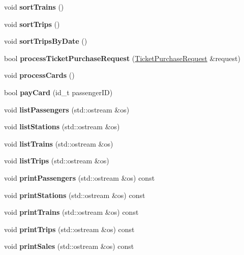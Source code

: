 \begin{DoxyCompactItemize}
void {\bfseries sort\+Trains} ()
\item 
\mbox{\label{classSystem_a9122a0e24a88b5111959fdc87b23bc6b}} 
void {\bfseries sort\+Trips} ()
\item 
\mbox{\label{classSystem_a3a2aace3c50cfbf7f9d2354cd858a59b}} 
void {\bfseries sort\+Trips\+By\+Date} ()
\item 
\mbox{\label{classSystem_ac2b6f3d934b64f4fa56ffb1db1d261df}} 
bool {\bfseries process\+Ticket\+Purchase\+Request} (\mbox{\hyperlink{classTicketPurchaseRequest}{Ticket\+Purchase\+Request}} \&request)
\item 
\mbox{\label{classSystem_aebffe11376f68cb17175f30ea517c10b}} 
void {\bfseries process\+Cards} ()
\item 
\mbox{\label{classSystem_ae5df9c6b2309272f8642cb16dbe5132e}} 
bool {\bfseries pay\+Card} (id\+\_\+t passenger\+ID)
\item 
\mbox{\label{classSystem_a23c0b01d0e84fa4665ce85203ce6747b}} 
void {\bfseries list\+Passengers} (std\+::ostream \&os)
\item 
\mbox{\label{classSystem_a06041827a7b47ad06eee9d121e42590c}} 
void {\bfseries list\+Stations} (std\+::ostream \&os)
\item 
\mbox{\label{classSystem_a0a6c0d8d1061893151f9b4ee3332ce85}} 
void {\bfseries list\+Trains} (std\+::ostream \&os)
\item 
\mbox{\label{classSystem_af11f201f6417c2658f35238d98c6f032}} 
void {\bfseries list\+Trips} (std\+::ostream \&os)
\item 
\mbox{\label{classSystem_a1c5753d5c70d15dc3fe56fd5e421ba76}} 
void {\bfseries print\+Passengers} (std\+::ostream \&os) const
\item 
\mbox{\label{classSystem_ac4b65c4fe2628e7d35b1027161e9d1da}} 
void {\bfseries print\+Stations} (std\+::ostream \&os) const
\item 
\mbox{\label{classSystem_af4610f38d80e01a18f2083a7c5fbd5ce}} 
void {\bfseries print\+Trains} (std\+::ostream \&os) const
\item 
\mbox{\label{classSystem_abaa61b6377abcfc61da32092e5d734d9}} 
void {\bfseries print\+Trips} (std\+::ostream \&os) const
\item 
\mbox{\label{classSystem_aaad47fd0e1bf746a0bed32feb9553e53}} 
void {\bfseries print\+Sales} (std\+::ostream \&os) const
\end{DoxyCompactItemize}
